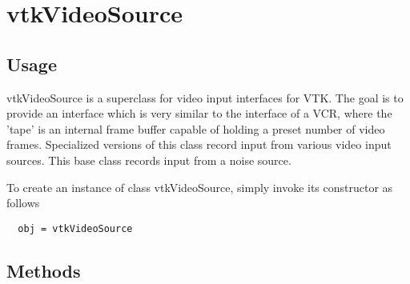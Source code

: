 \section{vtkVideoSource}

\subsection{Usage}

 vtkVideoSource is a superclass for video input interfaces for VTK.
 The goal is to provide an interface which is very similar to the
 interface of a VCR, where the 'tape' is an internal frame buffer
 capable of holding a preset number of video frames.  Specialized
 versions of this class record input from various video input sources.
 This base class records input from a noise source.

To create an instance of class vtkVideoSource, simply
invoke its constructor as follows
\begin{verbatim}
  obj = vtkVideoSource
\end{verbatim}
\subsection{Methods}

